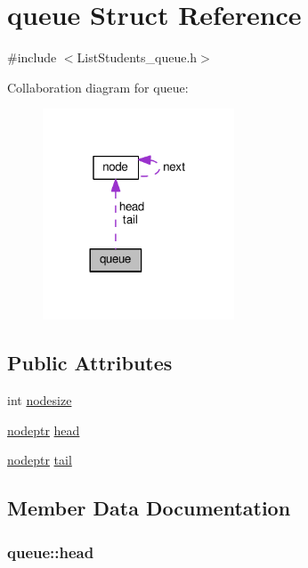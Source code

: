 \hypertarget{structqueue}{}\section{queue Struct Reference}
\label{structqueue}


{\ttfamily \#include $<$List\+Students\+\_\+queue.\+h$>$}



Collaboration diagram for queue\+:
\nopagebreak
\begin{figure}[H]
\begin{center}
\leavevmode
\includegraphics[width=161pt]{structqueue__coll__graph}
\end{center}
\end{figure}
\subsection*{Public Attributes}
\begin{DoxyCompactItemize}
\item 
int \hyperlink{structqueue_a652887eeb98c5e87bed0662c2da0e723}{nodesize}
\item 
\hyperlink{ListStudents__queue_8h_a0bfdc21bc19acf8a0ac274ebd1b6304a}{nodeptr} \hyperlink{structqueue_a23e9f810057d92adf24e3278dfe7865f}{head}
\item 
\hyperlink{ListStudents__queue_8h_a0bfdc21bc19acf8a0ac274ebd1b6304a}{nodeptr} \hyperlink{structqueue_a827de955c3490873a13e63e5478b444b}{tail}
\end{DoxyCompactItemize}


\subsection{Member Data Documentation}
\subsubsection[{\texorpdfstring{head}{head}}]{ queue\+::head}\hypertarget{structqueue_a23e9f810057d92adf24e3278dfe7865f}{}\label{structqueue_a23e9f810057d92adf24e3278dfe7865f}

